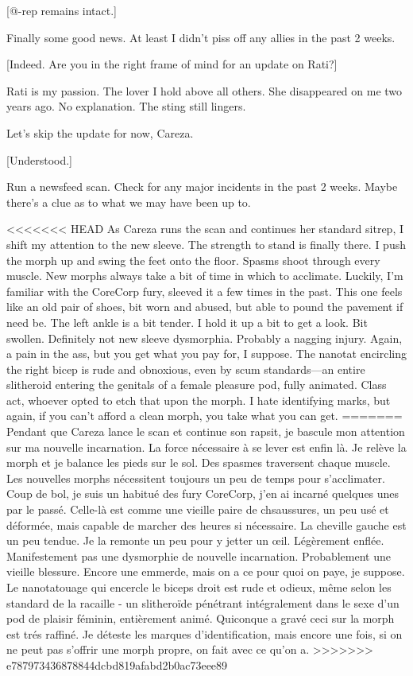 [@-rep remains intact.] 

Finally some good news. At least I didn't piss off any allies in the past 2 weeks. 

[Indeed. Are you in the right frame of mind for an update on Rati?] 

Rati is my passion. The lover I hold above all others. She disappeared on me two years ago. No explanation. The sting still lingers. 

Let's skip the update for now, Careza. 

[Understood.] 

Run a newsfeed scan. Check for any major incidents in the past 2 weeks. Maybe there's a clue as to what we may have been up to. 

<<<<<<< HEAD
As Careza runs the scan and continues her standard sitrep, I shift my attention to the new sleeve. The strength to stand is finally there. I push the morph up and swing the feet onto the floor. Spasms shoot through every muscle. New morphs always take a bit of time in which to acclimate. Luckily, I'm familiar with the CoreCorp fury, sleeved it a few times in the past. This one feels like an old pair of shoes, bit worn and abused, but able to pound the pavement if need be. The left ankle is a bit tender. I hold it up a bit to get a look. Bit swollen. Definitely not new sleeve dysmorphia. Probably a nagging injury. Again, a pain in the ass, but you get what you pay for, I suppose. The nanotat encircling the right bicep is rude and obnoxious, even by scum standards—an entire slitheroid entering the genitals of a female pleasure pod, fully animated. Class act, whoever opted to etch that upon the morph. I hate identifying marks, but again, if you can't afford a clean morph, you take what you can get. 
=======
Pendant que Careza lance le scan et continue son rapsit, je bascule mon attention sur ma nouvelle incarnation. La force nécessaire à se lever est enfin là. Je relève la morph et je balance les pieds sur le sol. Des spasmes traversent chaque muscle. Les nouvelles morphs nécessitent toujours un peu de temps pour s'acclimater. Coup de bol, je suis un habitué des fury CoreCorp, j'en ai incarné quelques unes par le passé. Celle-là est comme une vieille paire de chsaussures, un peu usé et déformée, mais capable de marcher des heures si nécessaire. La cheville gauche est un peu tendue. Je la remonte un peu pour y jetter un œil. Légèrement enflée. Manifestement pas une dysmorphie de nouvelle incarnation. Probablement une vieille blessure. Encore une emmerde, mais on a ce pour quoi on paye, je suppose. Le nanotatouage qui encercle le biceps droit est rude et odieux, même selon les standard de la racaille - un slitheroïde pénétrant intégralement dans le sexe d'un pod de plaisir féminin, entièrement animé. Quiconque a gravé ceci sur la morph est trés raffiné. Je déteste les marques d'identification, mais encore une fois, si on ne peut pas s'offrir une morph propre, on fait avec ce qu'on a. 
>>>>>>> e787973436878844dcbd819afabd2b0ac73eee89


